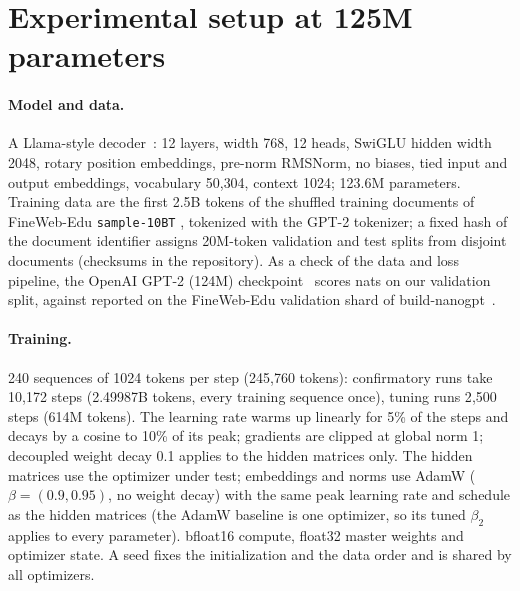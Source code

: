 \section{Experimental setup at 125M parameters}
\label{sec:setup}

\paragraph{Model and data.} A Llama-style decoder~\citep{touvron2023llama}: 12 layers, width 768,
12 heads, SwiGLU hidden width 2048, rotary position embeddings, pre-norm RMSNorm, no biases, tied
input and output embeddings, vocabulary 50{,}304, context 1024; 123.6M parameters. Training data
are the first 2.5B tokens of the shuffled training documents of FineWeb-Edu \texttt{sample-10BT}
\citep{penedo2024fineweb}, tokenized with the GPT-2 tokenizer; a fixed hash of the document identifier
assigns 20M-token validation and test splits from disjoint documents (checksums in the repository).
As a check of the data and loss pipeline, the OpenAI GPT-2 (124M) checkpoint~\citep{radford2019language}
scores \GptTwoOurVal{} nats on our validation split, against \GptTwoPublished{} reported on the
FineWeb-Edu validation shard of build-nanogpt~\citep{karpathy2024buildnanogpt}.

\paragraph{Training.} 240 sequences of 1024 tokens per step (245{,}760 tokens): confirmatory runs take
10{,}172 steps (2.49987B tokens, every training sequence once), tuning runs 2{,}500 steps (614M
tokens). The learning rate warms up linearly for 5\% of the steps and decays by a cosine to 10\% of
its peak; gradients are clipped at global norm 1; decoupled weight decay 0.1 applies to the hidden
matrices only. The hidden matrices use the optimizer under test; embeddings and norms use AdamW
($\beta=(0.9,0.95)$, no weight decay) with the same peak learning rate and schedule as the hidden
matrices (the AdamW baseline is one optimizer, so its tuned $\beta_2$ applies to every parameter).
bfloat16 compute, float32 master weights and optimizer state. A seed fixes the initialization and the data order and is shared by all optimizers.

